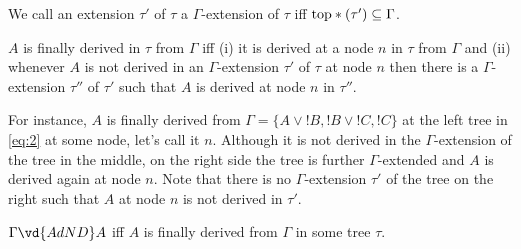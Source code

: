 We call an extension $\tau'$ of $\tau$ a $\Gamma$-extension
of $\tau$ iff ${\rm top}*(\tau') \subseteq \Gamma$. 
\begin{defn}
  $A$ is finally derived in $\tau$ from $\Gamma$ iff (i) it
  is derived at a node $n$ in $\tau$ from $\Gamma$ and (ii)
  whenever $A$ is not derived in an $\Gamma$-extension
  $\tau'$ of $\tau$ at node $n$ then there is a
  $\Gamma$-extension $\tau''$ of $\tau'$ such that $A$ is
  derived at node $n$ in $\tau''$.
\end{defn}

For instance, $A$ is finally derived from $\Gamma = \{A\vee
{!}B, !B \vee {!}C, !C\}$ at the left tree in \eqref{eq:2} at
some node, let's call it $n$. Although it is not derived in
the $\Gamma$-extension of the tree in the middle, on the
right side the tree is further $\Gamma$-extended and $A$ is
derived again at node $n$. Note that there is no
$\Gamma$-extension $\tau'$ of the tree on the right such that
$A$ at node $n$ is not derived in $\tau'$. 

\begin{defn}
  $\Gamma \vd{AdND} A$ iff $A$ is finally derived from
  $\Gamma$ in some tree $\tau$.
\end{defn}

\newpage
